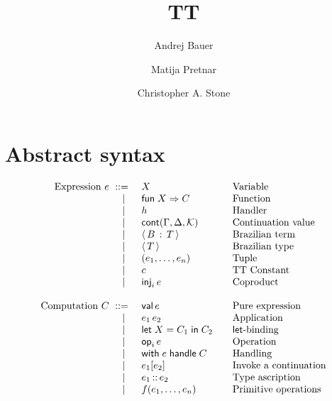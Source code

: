 \documentclass{article}
\newcommand{\C}{C}     %
\newcommand{\X}{X}     %
\newcommand{\rgn}{r}   %
\newcommand{\B}{B}     %
\newcommand{\KK}{{\cal K}} %
\newcommand{\val}{\mathsf{val}\,} %
\newcommand{\letin}[1]{\mathsf{let}\; #1 \;\mathsf{in}\;} %
\newcommand{\opOp}[2][i]{\mathsf{op}_{#1}\,#2} %
\newcommand{\withhandle}[1]{\mathsf{with}\;#1\;\mathsf{handle}\;} %
\newcommand{\abs}[1]{\mathsf{abs}\;#1\;\mathsf{in}\;} %
\newcommand{\new}[2]{\mathsf{new}(#1,#2)} %
\newcommand{\fun}[1]{\mathsf{fun}\;#1\Rightarrow} %
\newcommand{\ttapp}[2]{#1\,#2} %
\newcommand{\kapp}[2]{#1{}[#2]} %
\newcommand{\bterm}[2]{\langle\,#1\, :\, #2\,\rangle} %
\newcommand{\bty}[1]{\langle\,#1\,\rangle} %
\newcommand{\cont}[2][\G,\D]{\mathsf{cont}(#1,#2)}     %
\newcommand{\tuple}[1]{(#1)}
\newcommand{\generictuple}[1][n]{\tuple{e_1,\ldots,\e_{#1}}}
\renewcommand{\c}{c} %
\newcommand{\prim}[2][f]{#1(#2)} %
\newcommand{\genericprim}{\prim{\e_1,\ldots,\e_n}}
\newcommand{\inj}[2][i]{\mathsf{inj}_{#1}\, #2}
\begin{document}
\title{TT}
\author{Andrej Bauer \and Matija Pretnar \and Christopher A. Stone}
\maketitle

\section{Abstract syntax}
\label{sec:abstract-syntax}

\begin{equation*}
  \begin{array}{rl@{\qquad}l}
  \text{Expression $\e$}
    \bnf    & \X          & \text{Variable} \\
    \bnfor  & \fun{\X} \C  & \text{Function} \\
    \bnfor  & h           & \text{Handler} \\
    \bnfor  & \cont{\KK} & \text{Continuation value} \\
    \bnfor  & \bterm{\B}{\T}           & \text{Brazilian term} \\
    \bnfor  & \bty{\T}           & \text{Brazilian type} \\
    \bnfor  & \generictuple   & \text{Tuple}\\
    \bnfor  & \c              & \text{TT Constant}\\
    \bnfor  & \inj{\e}        & \text{Coproduct}\\
    \\
    \text{Computation $\C$}
      \bnf  & \val \e                & \text{Pure expression} \\
    \bnfor  & \ttapp{\e_1}{\e_2}   & \text{Application} \\
    \bnfor  & \letin{\X = \C_1} \C_2  & \text{$\mathsf{let}$-binding} \\
    \bnfor  & \opOp{\e} & \text{Operation} \\
    \bnfor  & \withhandle{\e} \C & \text{Handling} \\
    \bnfor  & \kapp{\e_1}{\e_2}   & \text{Invoke a continuation} \\
    \bnfor  & \ascribe{\e_1}{\e_2} & \text{Type ascription} \\
    \bnfor  & \genericprim & \text{Primitive operations}\\

\end{array}
\end{equation*}
\end{document}
